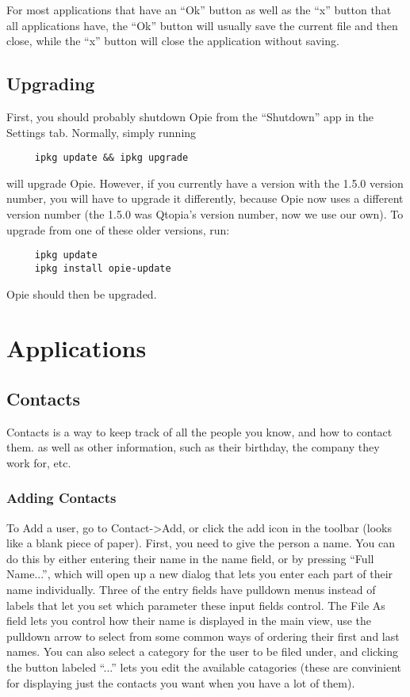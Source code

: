 \documentclass[12pt,letterpaper,oneside, openany]{book} \usepackage[latin1] {inputenc}
\begin{document}
For most applications that have an ``Ok'' button as well as the ``x'' button that all applications have, the ``Ok'' button will usually save the current file and then close, while the ``x'' button will close the application without saving.

\chapter{Upgrading} 

First, you should probably shutdown Opie from the ``Shutdown'' app in the Settings tab. Normally, simply running 
\begin{verbatim}
     ipkg update && ipkg upgrade
\end{verbatim}
will upgrade Opie. However, if you currently have a version with the 1.5.0 version number, you will have to upgrade it differently, because Opie now uses a different version number (the 1.5.0 was Qtopia's version number, now we use our own). To upgrade from one of these older versions, run: 
\begin{verbatim}
     ipkg update
     ipkg install opie-update
\end{verbatim}
Opie should then be upgraded.

\part{Applications}
\chapter{Contacts}
Contacts is a way to keep track of all the people you know, and how to contact them.  as well as other information, such as their birthday, the company they work for, etc.

\section{Adding Contacts}

To Add a user, go to Contact->Add, or click the add icon in the toolbar (looks like a blank piece of paper). First, you need to give the person a name. You can do this by either entering their name in the name field, or by pressing ``Full Name...'', which will open up a new dialog that lets you enter each part of their name individually. Three of the entry fields have pulldown menus instead of labels that let you set which parameter these input fields control. The File As field lets you control how their name is displayed in the main view, use the pulldown arrow to select from some common ways of ordering their first and last names. You can also select a category for the user to be filed under, and clicking the button labeled ``...'' lets you edit the available catagories (these are convinient for displaying just the contacts you want when you have a lot of them). 
\end{document}
